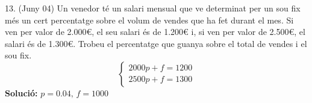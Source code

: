 \documentclass[12pt]{article}
\begin{document}
\begin{exercici}
13. (Juny 04) Un venedor té un salari mensual que ve determinat per un sou fix més un cert percentatge sobre el volum de vendes que ha fet durant el mes. Si ven per valor de 2.000€, el seu salari és de 1.200€ i, si ven per valor de 2.500€, el salari és de 1.300€. Trobeu el percentatge que guanya sobre el total de vendes i el sou fix.
\[
\begin{cases}
2000p + f = 1200 \\
2500p + f = 1300
\end{cases}
\]
\textbf{Solució:} \( p = 0.04, \, f = 1000 \)
\end{exercici}
\end{document}
